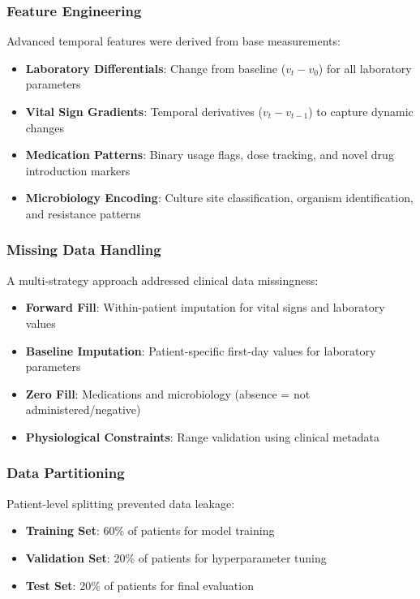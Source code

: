 \documentclass[11pt]{article}
\begin{document}
\subsubsection{Feature Engineering}
Advanced temporal features were derived from base measurements:
\begin{itemize}
    \item \textbf{Laboratory Differentials}: Change from baseline ($v_t - v_0$) for all laboratory parameters
    \item \textbf{Vital Sign Gradients}: Temporal derivatives ($v_t - v_{t-1}$) to capture dynamic changes
    \item \textbf{Medication Patterns}: Binary usage flags, dose tracking, and novel drug introduction markers
    \item \textbf{Microbiology Encoding}: Culture site classification, organism identification, and resistance patterns
\end{itemize}

\subsubsection{Missing Data Handling}
A multi-strategy approach addressed clinical data missingness:
\begin{itemize}
    \item \textbf{Forward Fill}: Within-patient imputation for vital signs and laboratory values
    \item \textbf{Baseline Imputation}: Patient-specific first-day values for laboratory parameters
    \item \textbf{Zero Fill}: Medications and microbiology (absence = not administered/negative)
    \item \textbf{Physiological Constraints}: Range validation using clinical metadata
\end{itemize}

\subsubsection{Data Partitioning}
Patient-level splitting prevented data leakage:
\begin{itemize}
    \item \textbf{Training Set}: 60\% of patients for model training
    \item \textbf{Validation Set}: 20\% of patients for hyperparameter tuning
    \item \textbf{Test Set}: 20\% of patients for final evaluation
\end{itemize}
\end{document}
